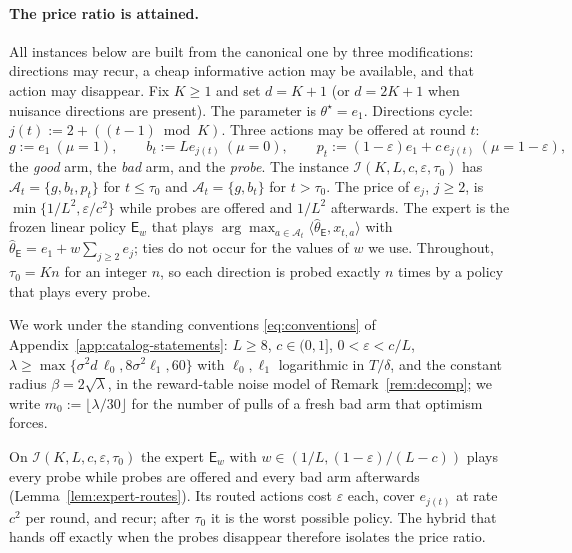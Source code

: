 \documentclass{article}
\theoremstyle{definition}
\theoremstyle{remark}
\newcommand{\eps}{\varepsilon}
\theoremstyle{remark}
\newcommand{\Exp}{\mathsf{E}}
\begin{document}
\paragraph{The price ratio is attained.}
All instances below are built from the canonical one by three modifications:
directions may recur, a cheap informative action may be available, and that
action may disappear. Fix $K\ge1$ and set $d=K+1$ (or $d=2K+1$ when nuisance
directions are present). The parameter is $\theta^\star=e_1$. Directions
cycle: $j(t):=2+((t-1)\bmod K)$. Three actions may be offered at round $t$:
\[
g:=e_1\ (\mu=1),\qquad
b_t:=Le_{j(t)}\ (\mu=0),\qquad
p_t:=(1-\eps)e_1+c\,e_{j(t)}\ (\mu=1-\eps),
\]
the \emph{good} arm, the \emph{bad} arm, and the \emph{probe}. The instance
$\mathcal I(K,L,c,\eps,\tau_0)$ has $\mathcal A_t=\{g,b_t,p_t\}$ for $t\le\tau_0$
and $\mathcal A_t=\{g,b_t\}$ for $t>\tau_0$. The price of $e_j$, $j\ge2$, is
$\min\{1/L^2,\eps/c^2\}$ while probes are offered and $1/L^2$ afterwards. The
expert is the frozen linear policy $\Exp_w$ that plays
$\arg\max_{a\in\mathcal A_t}\langle\widehat\theta_{\Exp},x_{t,a}\rangle$ with
$\widehat\theta_{\Exp}=e_1+w\sum_{j\ge2}e_j$; ties do not occur for the values
of $w$ we use. Throughout, $\tau_0=Kn$ for an integer $n$, so each direction is
probed exactly $n$ times by a policy that plays every probe.

We work under the standing conventions \eqref{eq:conventions} of
Appendix~\ref{app:catalog-statements}: $L\ge8$, $c\in(0,1]$, $0<\eps<c/L$,
$\lambda\ge\max\{\sigma^2d\,\ell_0,8\sigma^2\ell_1,60\}$ with $\ell_0,\ell_1$
logarithmic in $T/\delta$, and the constant radius $\beta=2\sqrt\lambda$, in
the reward-table noise model of Remark~\ref{rem:decomp}; we write
$m_0:=\lfloor\lambda/30\rfloor$ for the number of pulls of a fresh bad arm
that optimism forces.

On $\mathcal I(K,L,c,\eps,\tau_0)$ the expert $\Exp_w$ with
$w\in(1/L,(1-\eps)/(L-c))$ plays every probe while probes are offered and
every bad arm afterwards (Lemma~\ref{lem:expert-routes}). Its routed actions
cost $\eps$ each, cover $e_{j(t)}$ at rate $c^2$ per round, and recur; after
$\tau_0$ it is the worst possible policy. The hybrid that hands off exactly
when the probes disappear therefore isolates the price ratio.
\end{document}

